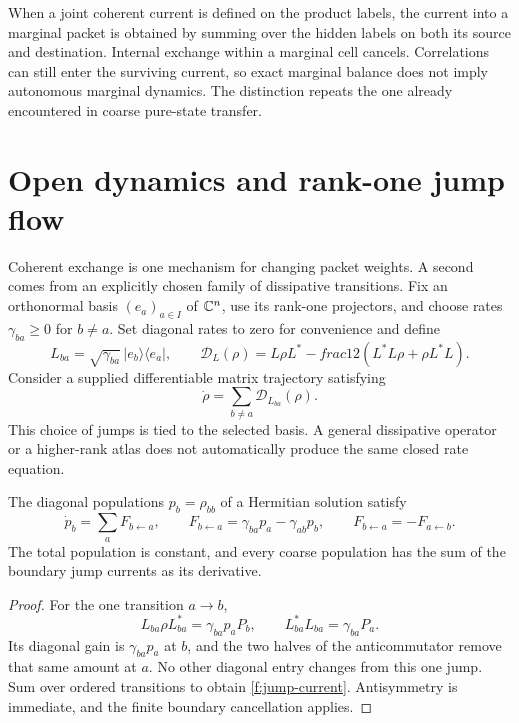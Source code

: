 When a joint coherent current is defined on the product labels, the current into a marginal packet is obtained by summing over the hidden labels on both its source and destination. Internal exchange within a marginal cell cancels. Correlations can still enter the surviving current, so exact marginal balance does not imply autonomous marginal dynamics. The distinction repeats the one already encountered in coarse pure-state transfer.



\section{Open dynamics and rank-one jump flow}\label{f:jumps}

Coherent exchange is one mechanism for changing packet weights. A second comes from an explicitly chosen family of dissipative transitions. Fix an orthonormal basis $(e_a)_{a\in I}$ of $\mathbb C^n$, use its rank-one projectors, and choose rates $\gamma_{ba}\ge0$ for $b\ne a$. Set diagonal rates to zero for convenience and define
\begin{equation}\label{f:jump-operators}
 L_{ba}=\sqrt{\gamma_{ba}}\,|e_b\rangle\langle e_a|,
 \qquad
 \mathcal D_L(\rho)=L\rho L^*-	frac12(L^*L\rho+\rho L^*L).
\end{equation}
Consider a supplied differentiable matrix trajectory satisfying
\begin{equation}\label{f:lindblad}
 \dot\rho=\sum_{b\ne a}\mathcal D_{L_{ba}}(\rho).
\end{equation}
This choice of jumps is tied to the selected basis. A general dissipative operator or a higher-rank atlas does not automatically produce the same closed rate equation.

\begin{proposition}\label{f:jump-theorem}
The diagonal populations $p_b=\rho_{bb}$ of a Hermitian solution satisfy
\begin{equation}\label{f:jump-current}
 \dot p_b=\sum_aF_{b\leftarrow a},\qquad
 F_{b\leftarrow a}=\gamma_{ba}p_a-\gamma_{ab}p_b,
 \qquad F_{b\leftarrow a}=-F_{a\leftarrow b}.
\end{equation}
The total population is constant, and every coarse population has the sum of the boundary jump currents as its derivative.
\end{proposition}

\begin{proof}
For the one transition $a\to b$,
\[
 L_{ba}\rho L_{ba}^*=\gamma_{ba}p_aP_b,\qquad
 L_{ba}^*L_{ba}=\gamma_{ba}P_a.
\]
Its diagonal gain is $\gamma_{ba}p_a$ at $b$, and the two halves of the anticommutator remove that same amount at $a$. No other diagonal entry changes from this one jump. Sum over ordered transitions to obtain \eqref{f:jump-current}. Antisymmetry is immediate, and the finite boundary cancellation applies.
\end{proof}

